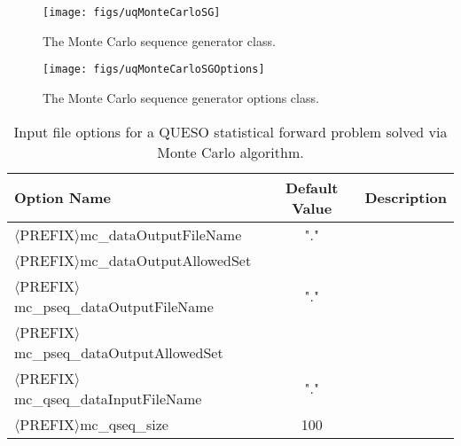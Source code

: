 \begin{figure}[htpb]
\centering
\texttt{[image: figs/uqMonteCarloSG]}
\vspace*{-8pt}
\caption{The Monte Carlo sequence generator class.}
\label{fig-monte-carlo-solver-class}
\end{figure}

\begin{figure}[htpb]
\centering
\texttt{[image: figs/uqMonteCarloSGOptions]}
\vspace*{-8pt}
\caption{The Monte Carlo sequence generator options class.}
\label{fig-monte-carlo-options-class}
\end{figure}

\begin{table}[htpb]
\begin{center}
\caption{Input file options for a QUESO statistical forward problem solved via Monte Carlo algorithm.}
\vspace{-8pt}
\label{tab-monte-carlo-options}
\ttfamily
\begin{tabular}{l c  m{6cm}}
\toprule
\rmfamily Option Name     & \rmfamily Default Value &  \rmfamily Description \\ %
\midrule\midrule
$\langle$PREFIX$\rangle$mc\_dataOutputFileName           &   "."   &             \\ %
$\langle$PREFIX$\rangle$mc\_dataOutputAllowedSet         &         &             \\ %
$\langle$PREFIX$\rangle$mc\_pseq\_dataOutputFileName     &    "."  &             \\ %
$\langle$PREFIX$\rangle$mc\_pseq\_dataOutputAllowedSet   &         &             \\ %
$\langle$PREFIX$\rangle$mc\_qseq\_dataInputFileName      &   "."   &             \\ %
$\langle$PREFIX$\rangle$mc\_qseq\_size                   &   100   &             \\ %

\end{tabular}
\end{center}
\end{table}
